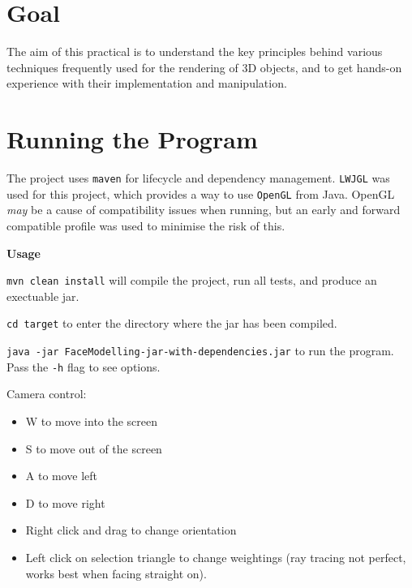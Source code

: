 \documentclass[12pt]{article}
\begin{document}
\begin{titlepage}

\vfill %

\end{titlepage}

\section*{Goal}

The aim of this practical is to understand the key principles behind various techniques
frequently used for the rendering of 3D objects, and to get hands-on experience with their implementation and manipulation.

\setcounter{page}{1} 

\section{Running the Program}

The project uses \texttt{maven} for lifecycle and dependency management.
\texttt{LWJGL} was used for this project, which provides a way to use \texttt{OpenGL} from Java. 
OpenGL \textit{may} be a cause of compatibility issues when running, but an early and forward compatible profile was used to minimise the risk of this.

\bigskip
\noindent\textbf{Usage} 

\noindent\texttt{mvn clean install} will compile the project, run all tests, and produce an exectuable jar.

\noindent\texttt{cd target} to enter the directory where the jar has been compiled.

\noindent \texttt{java -jar FaceModelling-jar-with-dependencies.jar} to run the program. Pass the \texttt{-h} flag to see options.

\noindent Camera control:
\begin{itemize}
    \item W to move into the screen
    \item S to move out of the screen
    \item A to move left
    \item D to move right
    \item Right click and drag to change orientation
    \item Left click on selection triangle to change weightings (ray tracing not perfect, works best when facing straight on).
\end{itemize}
\end{document}
